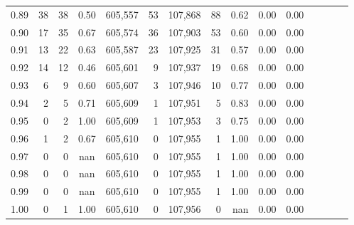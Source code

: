 \begin{tabular}{rrrcrrrrrrrrrrr}
0.89 &      38 &     38 &                                       0.50 &  605,557 &       53 &  107,868 &       88 &  0.62 &  0.00 &                         0.00 \\
0.90 &      17 &     35 &                                       0.67 &  605,574 &       36 &  107,903 &       53 &  0.60 &  0.00 &                         0.00 \\
0.91 &      13 &     22 &                                       0.63 &  605,587 &       23 &  107,925 &       31 &  0.57 &  0.00 &                         0.00 \\
0.92 &      14 &     12 &                                       0.46 &  605,601 &        9 &  107,937 &       19 &  0.68 &  0.00 &                         0.00 \\
0.93 &       6 &      9 &                                       0.60 &  605,607 &        3 &  107,946 &       10 &  0.77 &  0.00 &                         0.00 \\
0.94 &       2 &      5 &                                       0.71 &  605,609 &        1 &  107,951 &        5 &  0.83 &  0.00 &                         0.00 \\
0.95 &       0 &      2 &                                       1.00 &  605,609 &        1 &  107,953 &        3 &  0.75 &  0.00 &                         0.00 \\
0.96 &       1 &      2 &                                       0.67 &  605,610 &        0 &  107,955 &        1 &  1.00 &  0.00 &                         0.00 \\
0.97 &       0 &      0 &                                        nan &  605,610 &        0 &  107,955 &        1 &  1.00 &  0.00 &                         0.00 \\
0.98 &       0 &      0 &                                        nan &  605,610 &        0 &  107,955 &        1 &  1.00 &  0.00 &                         0.00 \\
0.99 &       0 &      0 &                                        nan &  605,610 &        0 &  107,955 &        1 &  1.00 &  0.00 &                         0.00 \\
1.00 &       0 &      1 &                                       1.00 &  605,610 &        0 &  107,956 &        0 &   nan &  0.00 &                         0.00 \\
\bottomrule
\end{tabular}

